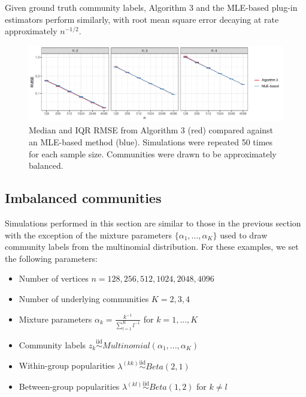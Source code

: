 \documentclass[12pt]{article}
\providecommand{\tightlist}{%
  \setlength{\itemsep}{0pt}\setlength{\parskip}{0pt}}
\begin{document}
Given ground truth community labels, Algorithm 3 and the MLE-based
plug-in estimators \cite{noroozi2019estimation, 307cbeb9b1be48299388437423d94bf1} 
perform similarly, with root mean square
error decaying at rate approximately \(n^{-1/2}\).

\begin{figure}[H]

{\centering \includegraphics{summary_files/figure-latex/lambda_est_k-1}

}

\caption{Median and IQR RMSE from Algorithm 3 (red) compared against an MLE-based method (blue). Simulations were repeated 50 times for each sample size. Communities were drawn to be approximately balanced.}\label{fig:lambda_est_k}
\end{figure}

\hypertarget{imbalanced-communities}{%
\subsection{Imbalanced communities}\label{imbalanced-communities}}

Simulations performed in this section are similar to those in the
previous section with the exception of the mixture parameters
\(\{\alpha_1, ..., \alpha_K\}\) used to draw community labels from the
multinomial distribution. For these examples, we set the following
parameters:

\begin{itemize}
\tightlist
\item
  Number of vertices \(n = 128, 256, 512, 1024, 2048, 4096\)
\item
  Number of underlying communities \(K = 2, 3, 4\)
\item
  Mixture parameters \(\alpha_k = \frac{k^{-1}}{\sum_{l=1}^K l^{-1}}\)
  for \(k = 1, ..., K\)
\item
  Community labels
  \(z_k \stackrel{\text{iid}}{\sim}Multinomial(\alpha_1, ..., \alpha_K)\)
\item
  Within-group popularities
  \(\lambda^{(kk)} \stackrel{\text{iid}}{\sim}Beta(2, 1)\)
\item
  Between-group popularities
  \(\lambda^{(kl)} \stackrel{\text{iid}}{\sim}Beta(1, 2)\) for
  \(k \neq l\)
\end{itemize}
\end{document}
